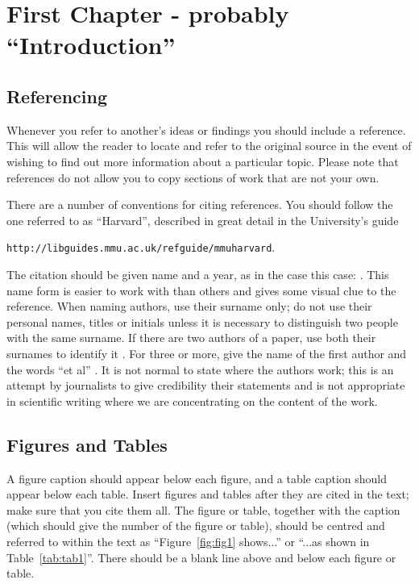 \chapter{First Chapter - probably ``Introduction''}
\label{chap:chap1}





\section{Referencing} 
Whenever you refer to another's ideas or findings you should include a reference. This will allow the reader to 
locate and refer to the original source in the event of wishing to find out more information about a particular 
topic. Please note that references do not allow you to copy sections of work that are not your own. 

There are a number of conventions for citing references. You should follow the one referred to as ``Harvard'', described in great detail in the University's guide 

\verb|http://libguides.mmu.ac.uk/refguide/mmuharvard|.

The citation should be given name and a year, as in the case this case: \textcite{frith-2012}. This name form is easier to work with than others and gives some visual clue to the reference. When naming authors, use their surname only; do not use their personal names, titles or initials unless it is necessary to distinguish two people with the same surname. If there are two authors of a paper, use both their surnames to identify it \parencite{ryoo-matthies-2013}. For three or more, give the name of the first author and the words ``et al'' \parencite{chen-j-k-2015}. It is not normal to state where the authors work; this is an attempt by journalists to give credibility their statements and is not appropriate in scientific writing where we are concentrating on the content of the work.


\section{Figures and Tables}
A figure caption should appear below each figure, and a table caption should appear below each table. Insert figures 
and tables after they are cited in the text; make sure that you cite them all. The figure or table, together with the caption (which should give the number of the figure or table), should be centred and referred to within the text as ``Figure~\ref{fig:fig1} shows...'' or ``...as shown in Table~\ref{tab:tab1}''. There should be a blank line 
above and below each figure or table. 

